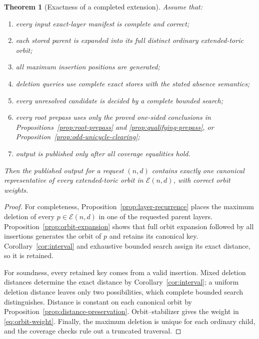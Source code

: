 \documentclass[11pt]{article}
\newtheorem{theorem}{Theorem}[section]
\theoremstyle{definition}
\theoremstyle{remark}
\newcommand{\E}{\mathcal E}
\begin{document}
\begin{theorem}[Exactness of a completed extension]
\label{thm:extension-correct}
Assume that:
\begin{enumerate}[label=(\alph*)]
  \item every input exact-layer manifest is complete and correct;
  \item each stored parent is expanded into its full distinct ordinary
    extended-toric orbit;
  \item all maximum insertion positions are generated;
  \item deletion queries use complete exact stores with the stated absence
    semantics;
  \item every unresolved candidate is decided by a complete bounded search;
  \item every root prepass uses only the proved one-sided conclusions in
    Propositions~\ref{prop:root-prepass} and
    \ref{prop:qualifying-prepass}, or
    Proposition~\ref{prop:odd-unicycle-clearing};
  \item output is published only after all coverage equalities hold.
\end{enumerate}
Then the published output for a request $(n,d)$ contains exactly one canonical
representative of every extended-toric orbit in $\E(n,d)$, with correct orbit
weights.
\end{theorem}

\begin{proof}
For completeness, Proposition~\ref{prop:layer-recurrence} places the
maximum deletion of every $p\in\E(n,d)$ in one of the requested parent
layers.  Proposition~\ref{prop:orbit-expansion} shows that full orbit
expansion followed by all insertions generates the orbit of $p$ and retains
its canonical key.  Corollary~\ref{cor:interval} and exhaustive bounded
search assign its exact distance, so it is retained.

For soundness, every retained key comes from a valid insertion.  Mixed
deletion distances determine the exact distance by
Corollary~\ref{cor:interval}; a uniform deletion distance leaves only two
possibilities, which complete bounded search distinguishes.  Distance is
constant on each canonical orbit by
Proposition~\ref{prop:distance-preservation}.  Orbit--stabilizer gives the
weight in \eqref{eq:orbit-weight}.  Finally, the maximum deletion is unique for each
ordinary child, and the coverage checks rule out a truncated traversal.
\end{proof}
\end{document}
